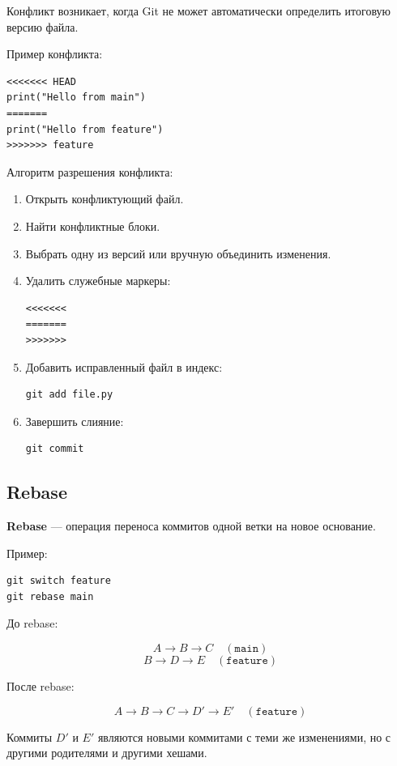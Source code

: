 \documentclass[12pt,a4paper]{article}
\begin{document}
Конфликт возникает, когда Git не может автоматически определить итоговую версию файла.

Пример конфликта:

\begin{lstlisting}
<<<<<<< HEAD
print("Hello from main")
=======
print("Hello from feature")
>>>>>>> feature
\end{lstlisting}

Алгоритм разрешения конфликта:

\begin{enumerate}
    \item Открыть конфликтующий файл.
    \item Найти конфликтные блоки.
    \item Выбрать одну из версий или вручную объединить изменения.
    \item Удалить служебные маркеры:
\begin{lstlisting}
<<<<<<<
=======
>>>>>>>
\end{lstlisting}
    \item Добавить исправленный файл в индекс:
\begin{lstlisting}
git add file.py
\end{lstlisting}
    \item Завершить слияние:
\begin{lstlisting}
git commit
\end{lstlisting}
\end{enumerate}

\subsection{Rebase}

\textbf{Rebase} --- операция переноса коммитов одной ветки на новое основание.

Пример:

\begin{lstlisting}
git switch feature
git rebase main
\end{lstlisting}

До rebase:

\[
A \rightarrow B \rightarrow C \quad (\texttt{main})
\]
\[
B \rightarrow D \rightarrow E \quad (\texttt{feature})
\]

После rebase:

\[
A \rightarrow B \rightarrow C \rightarrow D' \rightarrow E' \quad (\texttt{feature})
\]

Коммиты $D'$ и $E'$ являются новыми коммитами с теми же изменениями, но с другими родителями и другими хешами.
\end{document}
